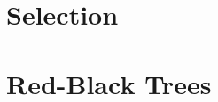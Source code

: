 \documentclass{summary}
\begin{document}
\section{Selection}














\section{Red-Black Trees}
\end{document}
